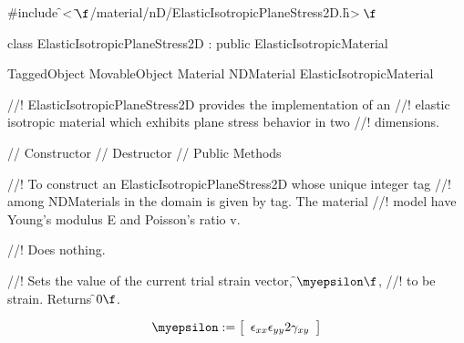 
\indent \#include \f$<\tilde{ }\f$/material/nD/ElasticIsotropicPlaneStress2D.h\f$>\f$

\indent class ElasticIsotropicPlaneStress2D : public ElasticIsotropicMaterial

\indent TaggedObject
\indent MovableObject
\indent\indent Material
\indent\indent\indent NDMaterial
\indent\indent\indent\indent ElasticIsotropicMaterial
\indent\indent\indent\indent{}

//! ElasticIsotropicPlaneStress2D provides the implementation of an
//! elastic isotropic material which exhibits plane stress behavior in two
//! dimensions.

\indent // Constructor
\indent // Destructor
\indent // Public Methods

//! To construct an ElasticIsotropicPlaneStress2D whose unique integer tag
//! among NDMaterials in the domain is given by \p tag.  The material
//! model have Young's modulus \p E and Poisson's ratio \p v.

//! Does nothing. 

//! Sets the value of the current trial strain vector, \f$\myepsilon\f$,
//! to be \p strain. Returns \f$0\f$.

\begin{displaymath}
\myepsilon := \left[
   \begin{array}{c}
       \epsilon_{xx}
       \epsilon_{yy}
       2 \gamma_{xy}   
   \end{array} 
 \right]
\end{displaymath}

